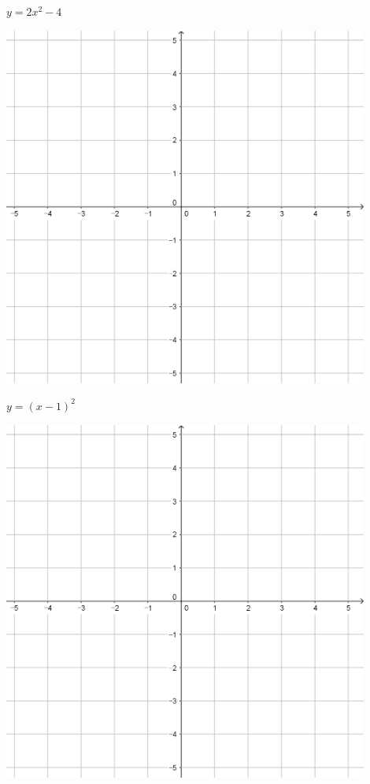 \documentclass{oblivoir}
\begin{document}
\begin{minipage}{0.45\textwidth}\centering
\(y=2x^2-4\)
\par\bigskip\includegraphics[width=0.9\textwidth]{55}
\end{minipage}
\begin{minipage}{0.45\textwidth}\centering
\(y=(x-1)^2\)
\par\bigskip\includegraphics[width=0.9\textwidth]{55}
\end{minipage}\bigskip\bigskip\par
\end{document}
